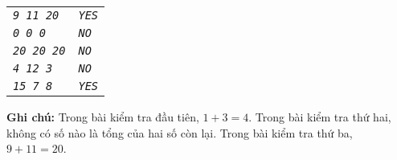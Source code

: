 \begin{ex}
\begin{center}
\begin{tabular}{|l|l|}
			\textit{\texttt{9 11 20}}          & \textit{\texttt{YES}}               \\ %
			\textit{\texttt{0 0 0}}            & \textit{\texttt{NO}}                \\
			\textit{\texttt{20 20 20}}         & \textit{\texttt{NO}}                \\
			\textit{\texttt{4 12 3}}           & \textit{\texttt{NO}}                \\
			\textit{\texttt{15 7 8}}           & \textit{\texttt{YES}}               \\
			\hline
		\end{tabular}
	\end{center}
	\textbf{Ghi chú: }Trong bài kiểm tra đầu tiên, $1 + 3 = 4$. Trong bài kiểm tra thứ hai, không có số nào là tổng của hai số còn lại. Trong bài kiểm tra thứ ba, $9 + 11 = 20$.


\end{ex}



